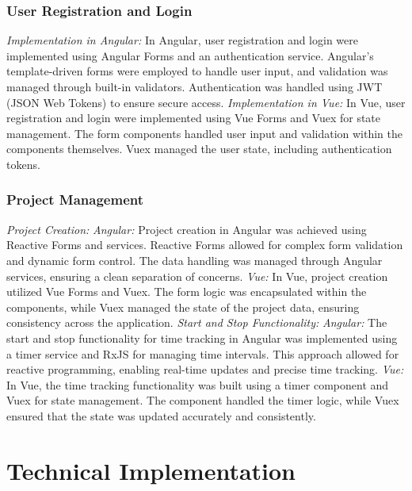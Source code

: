 \subsubsection{User Registration and Login}
\textit{Implementation in Angular: }In Angular, user registration and login were implemented using Angular Forms and an authentication service. Angular's template-driven forms were employed to handle user input, and validation was managed through built-in validators. Authentication was handled using JWT (JSON Web Tokens) to ensure secure access.\newline
\newline\textit{Implementation in Vue: }In Vue, user registration and login were implemented using Vue Forms and Vuex for state management. The form components handled user input and validation within the components themselves. Vuex managed the user state, including authentication tokens.
\subsubsection{Project Management}
\textit{Project Creation:\newline}
\textit{Angular: }Project creation in Angular was achieved using Reactive Forms and services. Reactive Forms allowed for complex form validation and dynamic form control. The data handling was managed through Angular services, ensuring a clean separation of concerns.
\newline\textit{Vue: }In Vue, project creation utilized Vue Forms and Vuex. The form logic was encapsulated within the components, while Vuex managed the state of the project data, ensuring consistency across the application.
\newline\newline
\textit{Start and Stop Functionality:\newline}
\textit{Angular: }The start and stop functionality for time tracking in Angular was implemented using a timer service and RxJS for managing time intervals. This approach allowed for reactive programming, enabling real-time updates and precise time tracking.
\newline\textit{Vue: }In Vue, the time tracking functionality was built using a timer component and Vuex for state management. The component handled the timer logic, while Vuex ensured that the state was updated accurately and consistently.
\section{Technical Implementation}
